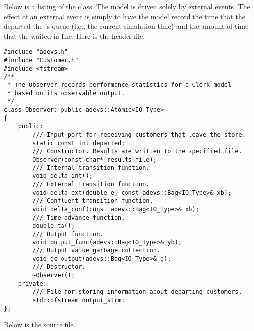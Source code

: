 Below is a listing of the  class. The model is driven
solely by external events. The effect of an external event is simply
to have the model record the time that the  departed the
's queue (i.e., the current simulation time) and the amount of time that
the  waited in line. Here is the  header file.
\begin{verbatim}
#include "adevs.h"
#include "Customer.h"
#include <fstream>
/**
 * The Observer records performance statistics for a Clerk model
 * based on its observable output.
 */
class Observer: public adevs::Atomic<IO_Type>
{
    public:
        /// Input port for receiving customers that leave the store.
        static const int departed;
        /// Constructor. Results are written to the specified file.
        Observer(const char* results_file);
        /// Internal transition function.
        void delta_int();
        /// External transition function.
        void delta_ext(double e, const adevs::Bag<IO_Type>& xb);
        /// Confluent transition function.
        void delta_conf(const adevs::Bag<IO_Type>& xb);
        /// Time advance function.
        double ta();
        /// Output function.  
        void output_func(adevs::Bag<IO_Type>& yb);
        /// Output value garbage collection.
        void gc_output(adevs::Bag<IO_Type>& g);
        /// Destructor.
        ~Observer();
    private:    
        /// File for storing information about departing customers.
        std::ofstream output_strm;
}; 
\end{verbatim}
Below is the  source file.
